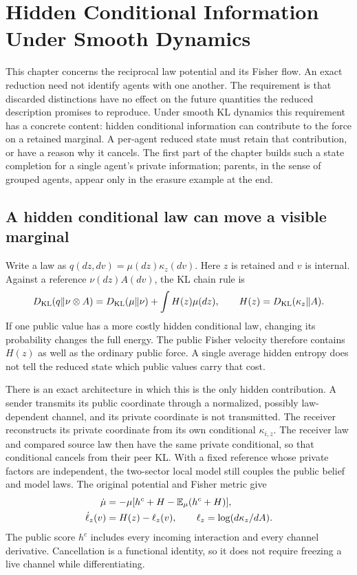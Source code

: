 \chapter{Hidden Conditional Information Under Smooth Dynamics}
\label{comp:smooth}

This chapter concerns the reciprocal law potential and its Fisher flow. An exact reduction need not identify agents with one another. The requirement is that discarded distinctions have no effect on the future quantities the reduced description promises to reproduce. Under smooth KL dynamics this requirement has a concrete content: hidden conditional information can contribute to the force on a retained marginal. A per-agent reduced state must retain that contribution, or have a reason why it cancels. The first part of the chapter builds such a state completion for a single agent's private information; parents, in the sense of grouped agents, appear only in the erasure example at the end.

\section{A hidden conditional law can move a visible marginal}

Write a law as $q(dz,dv)=\mu(dz)\kappa_z(dv)$. Here $z$ is retained and $v$ is internal. Against a reference $\nu(dz)A(dv)$, the KL chain rule is
\begin{equation}
 D_{\mathrm{KL}}(q\Vert\nu\otimes A)
 =D_{\mathrm{KL}}(\mu\Vert\nu)+\int H(z)\mu(dz),\qquad
 H(z)=D_{\mathrm{KL}}(\kappa_z\Vert A).
 \label{comp:smooth-energy}
\end{equation}
If one public value has a more costly hidden conditional law, changing its probability changes the full energy. The public Fisher velocity therefore contains $H(z)$ as well as the ordinary public force. A single average hidden entropy does not tell the reduced state which public values carry that cost.

There is an exact architecture in which this is the only hidden contribution. A sender transmits its public coordinate through a normalized, possibly law-dependent channel, and its private coordinate is not transmitted. The receiver reconstructs its private coordinate from its own conditional $\kappa_{i,z}$. The receiver law and compared source law then have the same private conditional, so that conditional cancels from their peer KL. With a fixed reference whose private factors are independent, the two-sector local model still couples the public belief and model laws. The original potential and Fisher metric give
\begin{equation}
 \begin{aligned}
 \dot\mu&=-\mu[h^c+H-\mathbb E_\mu(h^c+H)],\\
 \dot\ell_z(v)&=H(z)-\ell_z(v),\qquad
 \ell_z=\log(d\kappa_z/dA).
 \end{aligned}
 \label{comp:smooth-flow}
\end{equation}
The public score $h^c$ includes every incoming interaction and every channel derivative. Cancellation is a functional identity, so it does not require freezing a live channel while differentiating.

